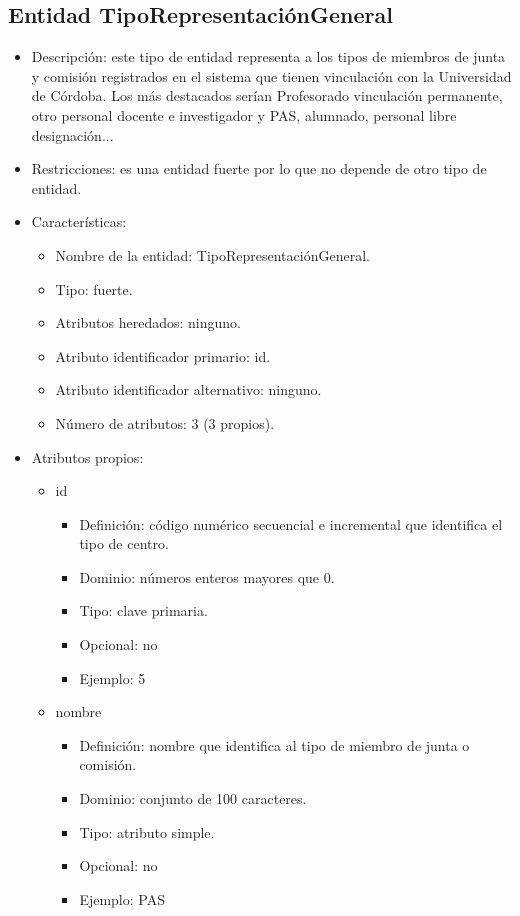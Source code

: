 \subsection{Entidad TipoRepresentaciónGeneral}
\begin{itemize}
    \item Descripción: este tipo de entidad representa a los tipos de miembros de junta y comisión registrados en el sistema que tienen vinculación con la Universidad de Córdoba. Los más destacados serían Profesorado vinculación permanente, otro personal docente e investigador y  PAS, alumnado, personal libre designación...
    \item Restricciones: es una entidad fuerte por lo que no depende de otro tipo de entidad.
    \item Características:
    \begin{itemize}
        \item Nombre de la entidad: TipoRepresentaciónGeneral.
        \item Tipo: fuerte.
        \item Atributos heredados: ninguno.
        \item Atributo identificador primario: id.
        \item Atributo identificador alternativo: ninguno.
        \item Número de atributos: 3 (3 propios).
    \end{itemize}

    \item Atributos propios:
    \begin{itemize}
        \item id
        \begin{itemize}
            \item Definición: código numérico secuencial e incremental que identifica el tipo de centro.
            \item Dominio: números enteros mayores que 0.
            \item Tipo: clave primaria.
            \item Opcional: no
            \item Ejemplo: 5
        \end{itemize}

        \item nombre
        \begin{itemize}
            \item Definición: nombre que identifica al tipo de miembro de junta o comisión.
            \item Dominio: conjunto de 100 caracteres.
            \item Tipo: atributo simple.
            \item Opcional: no
            \item Ejemplo: PAS
        \end{itemize}


\end{itemize}
\end{itemize}
